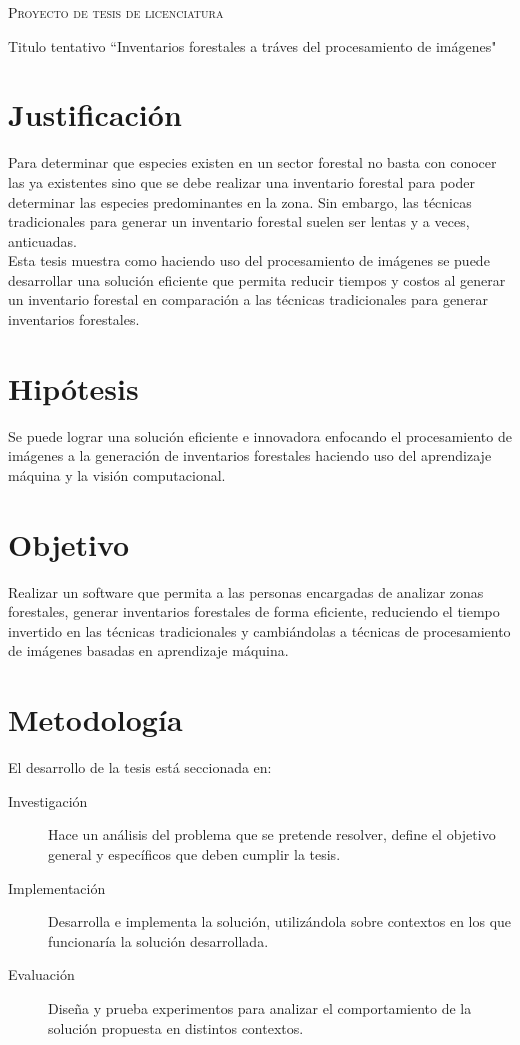 \documentclass{article}
\begin{document}
\begin{center} {\scshape\LARGE Proyecto de tesis de licenciatura \par} \end{center}
Titulo tentativo   ``Inventarios forestales a tráves del procesamiento de imágenes"

\section*{Justificación}
Para determinar que especies existen en un sector forestal no basta con conocer las ya existentes sino que se debe realizar una inventario forestal para poder determinar las especies predominantes en la zona. Sin embargo, las técnicas tradicionales para generar un inventario forestal suelen ser lentas y a veces, anticuadas.\newline\\
Esta tesis muestra como haciendo uso del procesamiento de imágenes se puede desarrollar una solución eficiente que permita reducir tiempos y costos al generar un inventario forestal en comparación a las técnicas tradicionales para generar inventarios forestales.

\section*{Hipótesis}
Se puede lograr una solución eficiente e innovadora enfocando el procesamiento de imágenes a la generación de inventarios forestales haciendo uso del aprendizaje máquina y la visión computacional.

\section*{Objetivo}
Realizar un software que permita a las personas encargadas de analizar zonas forestales, generar inventarios forestales de forma eficiente, reduciendo el tiempo invertido en las técnicas tradicionales y cambiándolas a técnicas de procesamiento de imágenes basadas en aprendizaje máquina.

\section*{Metodología}
El desarrollo de la tesis está seccionada en:

\begin{description}
\item[Investigación]{Hace un análisis del problema que se pretende resolver, define el objetivo general y específicos que deben cumplir la tesis.}

\item[Implementación]{Desarrolla e implementa la solución, utilizándola sobre contextos en los que funcionaría la solución desarrollada. }

\item[Evaluación]{Diseña y prueba experimentos para analizar el comportamiento de la solución propuesta en distintos contextos.}

\end{description}
\end{document}
